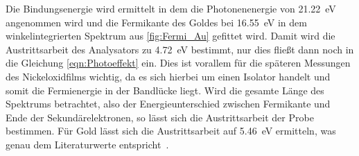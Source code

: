         Die Bindungsenergie wird ermittelt in dem die Photonenenergie von \SI{21.22}{\electronvolt} angenommen wird und die Fermikante des Goldes bei \SI{16.55}{\electronvolt} in dem winkelintegrierten Spektrum aus \autoref{fig:Fermi_Au} gefittet wird.
        Damit wird die Austrittsarbeit des Analysators zu \SI{4.72}{\electronvolt} bestimmt, nur dies fließt dann noch in die Gleichung \ref{eqn:Photoeffekt} ein.
        Dies ist vorallem für die späteren Messungen des Nickeloxidfilms wichtig, da es sich hierbei um einen Isolator handelt und somit die Fermienergie in der Bandlücke liegt.
        Wird die gesamte Länge des Spektrums betrachtet, also der Energieunterschied zwischen Fermikante und Ende der Sekundärelektronen, so lässt sich die Austrittsarbeit der Probe bestimmen.
        Für Gold lässt sich die Austrittsarbeit auf \SI{5.46}{\electronvolt} ermitteln, was genau dem Literaturwerte entspricht~\cite{5A_4}.
   
